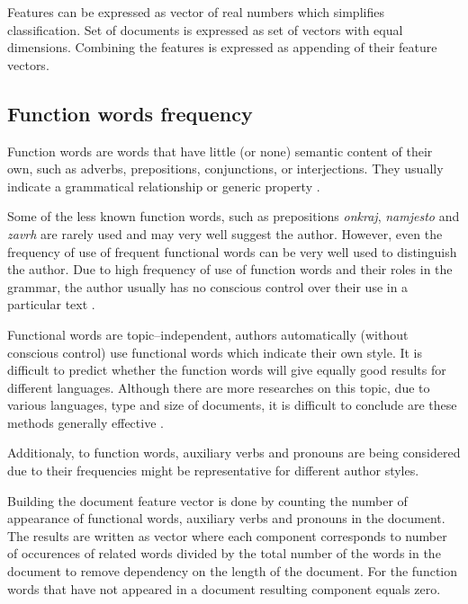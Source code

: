 \documentclass[11pt,english]{article}
\begin{document}
\begin{multicols}{2}
Features can be expressed as vector of real numbers which simplifies
classification. Set of documents is expressed as set of vectors with equal dimensions.
Combining the features is expressed as appending of their feature
vectors.



\subsection{Function words frequency}
\label{sec:funkcijske-rijeci}
Function words are words that have little (or none) semantic content of their
own, such as adverbs, prepositions, conjunctions, or interjections. They usually
indicate a grammatical relationship or generic property
\citep{zhao2005effective}.

Some of the less known function words, such as prepositions \emph{onkraj},
\emph{namjesto} and \emph{zavrh} are rarely used and may very well suggest the
author. However, even the frequency of use of frequent functional words can be
very well used to distinguish the author. Due to high frequency of use of
function words and their roles in the grammar, the author usually has no
conscious control over their use in a particular text
\citep{argamon2005measuring}.

Functional words are topic--independent, authors automatically (without conscious
control) use functional words which indicate their own style.
It is difficult to predict whether the function words will give equally good
results for different languages. Although there are more researches on this
topic, due to various languages, type and size of documents, it is difficult to
conclude are these methods generally effective \citep{zhao2005effective}.

Additionaly, to function words, auxiliary verbs and pronouns are being
considered due to their frequencies might be representative for different
author styles.

Building the document feature vector is done by counting the number of appearance
of functional words, auxiliary verbs and pronouns in the document. The results
are written as vector where each component corresponds to number of occurences of
related words divided by the total number of the words in the document to remove
dependency on the length of the document. For the function words that have not
appeared in a document resulting component equals zero.


\end{multicols}
\end{document}
